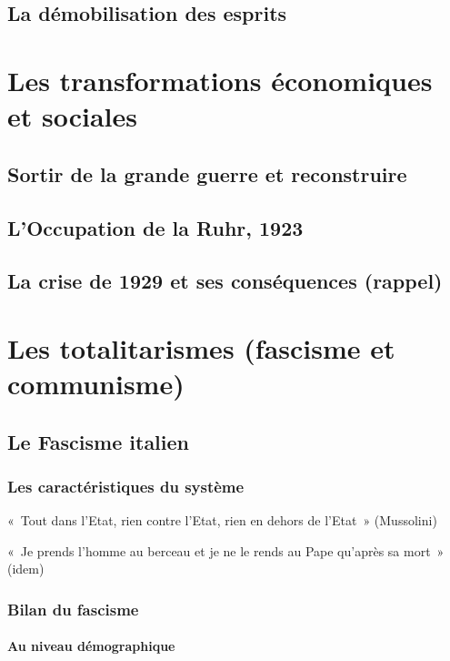 \documentclass[12pt]{report}
\begin{document}
\section{La démobilisation des esprits}

\chapter{Les transformations économiques et sociales}

\section{Sortir de la grande guerre et reconstruire}

\section{L'Occupation de la Ruhr, 1923}

\section{La crise de 1929 et ses conséquences (rappel)}

\chapter{Les totalitarismes (fascisme et communisme)}

\section{Le Fascisme italien}

\subsection{Les caractéristiques du système}

«~Tout dans l’Etat, rien contre l’Etat, rien en dehors de l’Etat~» (Mussolini)

«~Je prends l’homme au berceau et je ne le rends au Pape qu’après sa mort~» (idem)

\subsection{Bilan du fascisme}

\subsubsection{Au niveau démographique}
\end{document}
